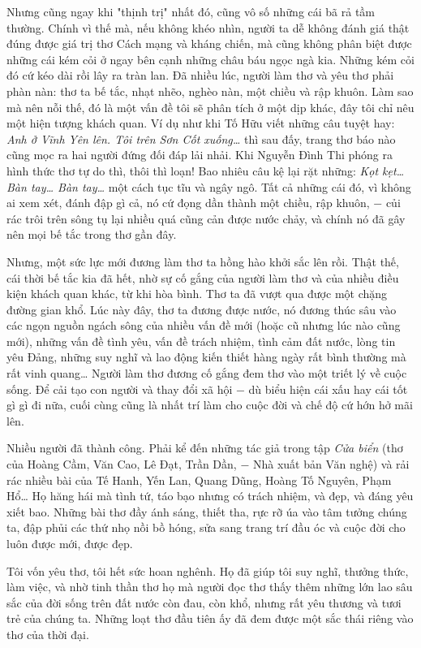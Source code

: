 \documentclass[../main.tex]{subfiles}
\begin{document}
\begin{multicols}{2}
Nhưng cũng ngay khi "thịnh trị" nhất đó, cũng vô số những cái bã rả tầm thường. Chính vì thế mà, nếu không khéo nhìn, người ta dễ không đánh giá thật đúng được giá trị thơ Cách mạng và kháng chiến, mà cũng không phân biệt được những cái kém cỏi ở ngay bên cạnh những châu báu ngọc ngà kia. Những kém cỏi đó cứ kéo dài rồi lây ra tràn lan. Đã nhiều lúc, người làm thơ và yêu thơ phải phàn nàn: thơ ta bế tắc, nhạt nhẽo, nghèo nàn, một chiều và rập khuôn. Làm sao mà nên nỗi thế, đó là một vấn đề tôi sẽ phân tích ở một dịp khác, đây tôi chỉ nêu một hiện tượng khách quan. Ví dụ như khi Tố Hữu viết những câu tuyệt hay: \textit{Anh ở Vĩnh Yên lên. Tôi trên Sơn Cốt xuống…} thì sau đấy, trang thơ báo nào cũng mọc ra hai người đứng đối đáp lải nhải. Khi Nguyễn Đình Thi phóng ra hình thức thơ tự do thì, thôi thì loạn! Bao nhiêu câu kệ lại rặt những: \textit{Kọt kẹt… Bàn tay… Bàn tay…} một cách tục tĩu và ngây ngô. Tất cả những cái đó, vì không ai xem xét, đánh đập gì cả, nó cứ đọng dần thành một chiều, rập khuôn, − củi rác trôi trên sông tụ lại nhiều quá cũng cản được nước chảy, và chính nó đã gây nên mọi bế tắc trong thơ gần đây. 
 
Nhưng, một sức lực mới đương làm thơ ta hồng hào khởi sắc lên rồi. Thật thế, cái thời bế tắc kia đã hết, nhờ sự cố gắng của người làm thơ và của nhiều điều kiện khách quan khác, từ khi hòa bình. Thơ ta đã vượt qua được một chặng đường gian khổ. Lúc này đây, thơ ta đương được nước, nó đương thúc sâu vào các ngọn nguồn ngách sông của nhiều vấn đề mới (hoặc cũ nhưng lúc nào cũng mới), những vấn đề tình yêu, vấn đề trách nhiệm, tình cảm đất nước, lòng tin yêu Đảng, những suy nghĩ và lao động kiến thiết hàng ngày rất bình thường mà rất vinh quang… Người làm thơ đương cố gắng đem thơ vào một triết lý về cuộc sống. Để cải tạo con người và thay đổi xã hội − dù biểu hiện cái xấu hay cái tốt gì gì đi nữa, cuối cùng cũng là nhất trí làm cho cuộc đời và chế độ cứ hớn hở mãi lên. 
 
Nhiều người đã thành công. Phải kể đến những tác giả trong tập \textit{Cửa biển }(thơ của Hoàng Cầm, Văn Cao, Lê Đạt, Trần Dần, − Nhà xuất bản Văn nghệ) và rải rác nhiều bài của Tế Hanh, Yến Lan, Quang Dũng, Hoàng Tố Nguyên, Phạm Hổ… Họ hăng hái mà tình tứ, táo bạo nhưng có trách nhiệm, và đẹp, và đáng yêu xiết bao. Những bài thơ đầy ánh sáng, thiết tha, rực rỡ úa vào tâm tưởng chúng ta, đập phủi các thứ nhọ nồi bồ hóng, sửa sang trang trí đầu óc và cuộc đời cho luôn được mới, được đẹp. 
 
Tôi vốn yêu thơ, tôi hết sức hoan nghênh. Họ đã giúp tôi suy nghĩ, thưởng thức, làm việc, và nhờ tinh thần thơ họ mà người đọc thơ thấy thêm những lớn lao sâu sắc của đời sống trên đất nước còn đau, còn khổ, nhưng rất yêu thương và tươi trẻ của chúng ta. Những loạt thơ đầu tiên ấy đã đem được một sắc thái riêng vào thơ của thời đại. 
 

\end{multicols}
\end{document}
